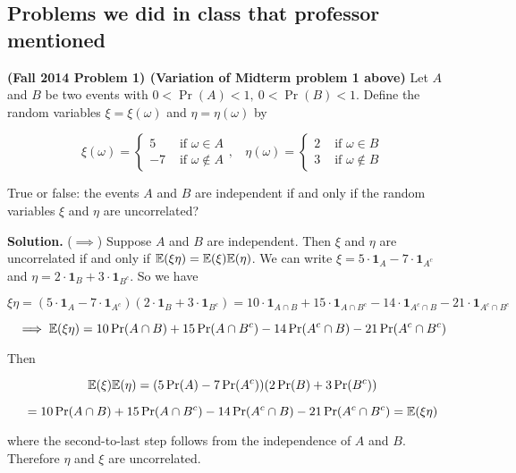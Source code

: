 

\subsection{Problems we did in class that professor mentioned}

\textbf{(Fall 2014 Problem 1) (Variation of Midterm problem 1 above)} Let \(A\) and \(B\) be two events with \(0 < \Pr(A) < 1, \ 0 < \Pr(B) < 1\). Define the random variables \(\xi = \xi(\omega)\) and \(\eta = \eta(\omega)\) by

\[
\xi(\omega) = \begin{cases} 
      5 & \text{ if } \omega \in A \\
      -7 &  \text{ if } \omega \notin A 
   \end{cases}, \ \ \ \ \eta(\omega) = \begin{cases} 
      2 & \text{ if } \omega \in B \\
      3 &  \text{ if } \omega \notin B 
   \end{cases}
\]

True or false: the events \(A\) and \(B\) are independent if and only if the random variables \(\xi\) and \(\eta\) are uncorrelated?

\textbf{Solution.} (\(\implies\)) Suppose \(A\) and \(B\) are independent. Then \(\xi\) and \(\eta\) are uncorrelated if and only if \(\mathbb{E}(\xi \eta ) = \mathbb{E}(\xi) \mathbb{E}(\eta)\). We can write \(\xi = 5 \cdot \boldsymbol{1}_A - 7 \cdot \boldsymbol{1}_{A^c}\) and \(\eta = 2 \cdot \boldsymbol{1}_B + 3 \cdot \boldsymbol{1}_{B^c}\). So we have

\[
\xi \eta = (5 \cdot \boldsymbol{1}_A - 7 \cdot \boldsymbol{1}_{A^c})(2 \cdot \boldsymbol{1}_B + 3 \cdot \boldsymbol{1}_{B^c}) = 10 \cdot \boldsymbol{1}_{A \cap B} +15 \cdot \boldsymbol{1}_{A \cap B^c} - 14 \cdot \boldsymbol{1}_{A^c \cap B} - 21 \cdot \boldsymbol{1}_{A^c \cap B^c}
\]

\[
\implies \mathbb{E}(\xi \eta ) = 10 \Pr(A \cap B) +15\Pr(A \cap B^c) - 14 \Pr(A^c \cap B) - 21\Pr(A^c \cap B^c)
\]

Then

\[
\mathbb{E}(\xi) \mathbb{E}(\eta) = (5 \Pr(A) - 7 \Pr(A^c))(2 \Pr(B) + 3 \Pr(B^c)) 
\]

\[
= 10\Pr(A \cap B) + 15 \Pr(A \cap B^c) - 14 \Pr(A^c \cap B) - 21 \Pr(A^c \cap B^c) = \mathbb{E}(\xi \eta )
\]

where the second-to-last step follows from the independence of \(A\) and \(B\). Therefore \(\eta\) and \(\xi\) are uncorrelated.

